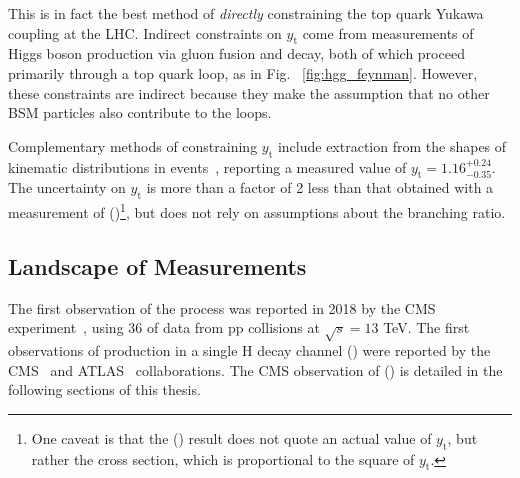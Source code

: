This is in fact the best method of \emph{directly} constraining the top quark Yukawa coupling at the LHC.
Indirect constraints on $y_\text{t}$ come from measurements of Higgs boson production via gluon fusion and \Hgg decay, both of which proceed primarily through a top quark loop, as in Fig. ~\ref{fig:hgg_feynman}.
However, these constraints are indirect because they make the assumption that no other BSM particles also contribute to the loops. 

Complementary methods of constraining $y_\text{t}$ include extraction from the shapes of kinematic distributions in \ttb events~\cite{CMS:2020qzr}, reporting a measured value of $y_\text{t} = 1.16^{+0.24}_{-0.35}$.
The uncertainty on $y_\text{t}$ is more than a factor of 2 less than that obtained with a measurement of \ttH (\Hgg)\footnote{One caveat is that the \ttH (\Hgg) result does not quote an actual value of $y_\text{t}$, but rather the \ttH cross section, which is proportional to the square of $y_\text{t}$.}, but does not rely on assumptions about the \Hgg branching ratio.

\subsection{Landscape of \ttH Measurements}
The first observation of the \ttH process was reported in 2018 by the CMS experiment~\cite{Sirunyan:2018hoz}, using 36 \fbinv of data from pp collisions at $\sqrt{s} = 13$ TeV.
The first observations of \ttH production in a single H decay channel (\Hgg) were reported by the CMS~\cite{tth_observation} and ATLAS~\cite{Aad:2020ivc} collaborations.
The CMS observation of \ttH (\Hgg) is detailed in the following sections of this thesis.



